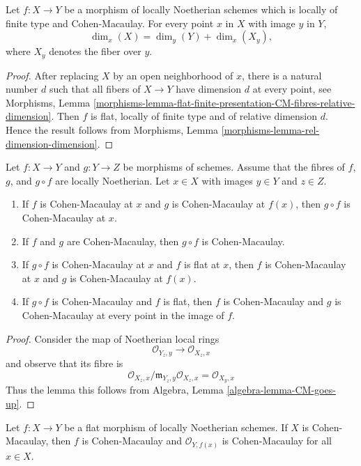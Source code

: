 \begin{lemma}
\label{lemma-CM-dimension}
Let $f : X \to Y$ be a morphism of locally Noetherian schemes
which is locally of finite type and Cohen-Macaulay.
For every point $x$ in $X$ with image $y$ in $Y$,
$$
\dim_x(X) = \dim_y(Y) + \dim_x(X_y),
$$
where $X_y$ denotes the fiber over $y$.
\end{lemma}

\begin{proof}
After replacing $X$ by an open neighborhood of $x$,
there is a natural number $d$ such that all fibers
of $X \to Y$ have dimension $d$ at every point, see
Morphisms, Lemma
\ref{morphisms-lemma-flat-finite-presentation-CM-fibres-relative-dimension}.
Then $f$ is flat, locally of finite type
and of relative dimension $d$. Hence the result follows from
Morphisms, Lemma \ref{morphisms-lemma-rel-dimension-dimension}.
\end{proof}

\begin{lemma}
\label{lemma-composition-CM}
Let $f : X \to Y$ and $g : Y \to Z$ be morphisms of schemes. Assume that the
fibres of $f$, $g$, and $g \circ f$ are locally Noetherian.
Let $x \in X$ with images $y \in Y$ and $z \in Z$.
\begin{enumerate}
\item If $f$ is Cohen-Macaulay at $x$ and $g$ is Cohen-Macaulay
at $f(x)$, then $g \circ f$ is Cohen-Macaulay at $x$.
\item If $f$ and $g$ are Cohen-Macaulay, then $g \circ f$ is Cohen-Macaulay.
\item If $g \circ f$ is Cohen-Macaulay at $x$ and $f$ is flat at $x$,
then $f$ is Cohen-Macaulay at $x$ and $g$ is Cohen-Macaulay at $f(x)$.
\item If $g \circ f$ is Cohen-Macaulay and $f$ is flat, then
$f$ is Cohen-Macaulay and $g$ is Cohen-Macaulay at every point in
the image of $f$.
\end{enumerate}
\end{lemma}

\begin{proof}
Consider the map of Noetherian local rings
$$
\mathcal{O}_{Y_z, y} \to \mathcal{O}_{X_z, x}
$$
and observe that its fibre is
$$
\mathcal{O}_{X_z, x}/\mathfrak m_{Y_z, y}\mathcal{O}_{X_z, x} =
\mathcal{O}_{X_y, x}
$$
Thus the lemma this follows from
Algebra, Lemma \ref{algebra-lemma-CM-goes-up}.
\end{proof}

\begin{lemma}
\label{lemma-flat-morphism-from-CM-scheme}
Let $f : X \to Y$ be a flat morphism of locally Noetherian schemes.
If $X$ is Cohen-Macaulay, then $f$ is Cohen-Macaulay and
$\mathcal{O}_{Y, f(x)}$ is Cohen-Macaulay for all $x \in X$.
\end{lemma}

